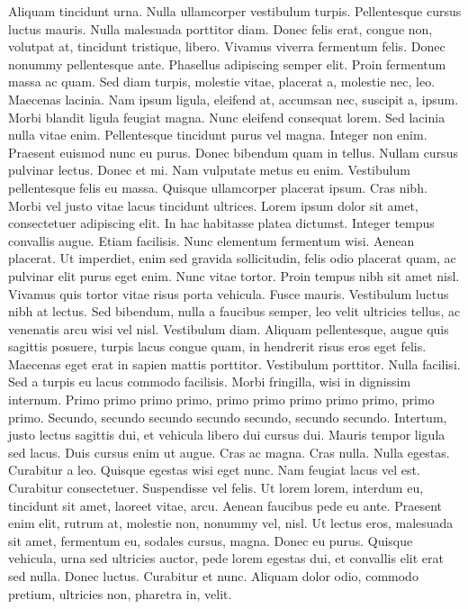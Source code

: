\documentclass[draft,12pt,twoside,a4paper]{book}
\begin{document}
Aliquam tincidunt urna.
Nulla ullamcorper vestibulum turpis.
Pellentesque cursus luctus mauris.
Nulla malesuada porttitor diam.
Donec felis erat, congue non, volutpat at, tincidunt tristique, libero.
Vivamus viverra fermentum felis.
Donec nonummy pellentesque ante.
Phasellus adipiscing semper elit.
Proin fermentum massa ac quam.
Sed diam turpis, molestie vitae, placerat a, molestie nec, leo.
Maecenas lacinia.
Nam ipsum ligula, eleifend at, accumsan nec, suscipit a, ipsum.
Morbi blandit ligula feugiat magna.
Nunc eleifend consequat lorem.
Sed lacinia nulla vitae enim.
Pellentesque tincidunt purus vel magna.
Integer non enim.
Praesent euismod nunc eu purus.
Donec bibendum quam in tellus.
Nullam cursus pulvinar lectus.
Donec et mi.
Nam vulputate metus eu enim.
Vestibulum pellentesque felis eu massa.
Quisque ullamcorper placerat ipsum.
Cras nibh.
Morbi vel justo vitae lacus tincidunt ultrices.
Lorem ipsum dolor sit amet, consectetuer adipiscing elit.
In hac habitasse platea dictumst.
Integer tempus convallis augue.
Etiam facilisis.
Nunc elementum fermentum wisi.
Aenean placerat.
Ut imperdiet, enim sed gravida sollicitudin, felis odio placerat quam,
 ac pulvinar elit purus eget enim.
Nunc vitae tortor.
Proin tempus nibh sit amet nisl.
Vivamus quis tortor vitae risus porta vehicula.
Fusce mauris.
Vestibulum luctus nibh at lectus.
Sed bibendum, nulla a faucibus semper, leo velit ultricies tellus,
 ac venenatis arcu wisi vel nisl.
Vestibulum diam.
Aliquam pellentesque, augue quis sagittis posuere, turpis lacus congue quam,
 in hendrerit risus eros eget felis.
Maecenas eget erat in sapien mattis porttitor.
Vestibulum porttitor.
Nulla facilisi.
Sed a turpis eu lacus commodo facilisis.
Morbi fringilla, wisi in dignissim internum.
Primo primo primo primo, primo primo primo primo primo, primo primo.
Secundo, secundo secundo secundo secundo, secundo secundo.
Intertum, justo lectus sagittis dui, et vehicula libero dui cursus dui.
Mauris tempor ligula sed lacus.
Duis cursus enim ut augue.
Cras ac magna.
Cras nulla.
Nulla egestas.
Curabitur a leo.
Quisque egestas wisi eget nunc.
Nam feugiat lacus vel est.
Curabitur consectetuer.
Suspendisse vel felis.
Ut lorem lorem, interdum eu, tincidunt sit amet, laoreet vitae, arcu.
Aenean faucibus pede eu ante.
Praesent enim elit, rutrum at, molestie non, nonummy vel, nisl.
Ut lectus eros, malesuada sit amet, fermentum eu, sodales cursus, magna.
Donec eu purus.
Quisque vehicula, urna sed ultricies auctor, pede lorem egestas dui,
 et convallis elit erat sed nulla.
Donec luctus.
Curabitur et nunc.
Aliquam dolor odio, commodo pretium, ultricies non, pharetra in, velit.
\end{document}
